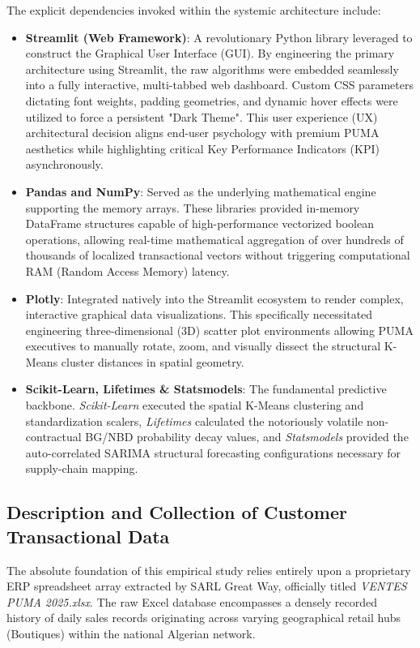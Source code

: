 \documentclass[12pt,a4paper]{report}
\begin{document}
The explicit dependencies invoked within the systemic architecture include:
\begin{itemize}
    \item \textbf{Streamlit (Web Framework)}: A revolutionary Python library leveraged to construct the Graphical User Interface (GUI). By engineering the primary architecture using Streamlit, the raw algorithms were embedded seamlessly into a fully interactive, multi-tabbed web dashboard. Custom CSS parameters dictating font weights, padding geometries, and dynamic hover effects were utilized to force a persistent "Dark Theme". This user experience (UX) architectural decision aligns end-user psychology with premium PUMA aesthetics while highlighting critical Key Performance Indicators (KPI) asynchronously.
    \item \textbf{Pandas and NumPy}: Served as the underlying mathematical engine supporting the memory arrays. These libraries provided in-memory DataFrame structures capable of high-performance vectorized boolean operations, allowing real-time mathematical aggregation of over hundreds of thousands of localized transactional vectors without triggering computational RAM (Random Access Memory) latency.
    \item \textbf{Plotly}: Integrated natively into the Streamlit ecosystem to render complex, interactive graphical data visualizations. This specifically necessitated engineering three-dimensional (3D) scatter plot environments allowing PUMA executives to manually rotate, zoom, and visually dissect the structural K-Means cluster distances in spatial geometry.
    \item \textbf{Scikit-Learn, Lifetimes \& Statsmodels}: The fundamental predictive backbone. \textit{Scikit-Learn} executed the spatial K-Means clustering and standardization scalers, \textit{Lifetimes} calculated the notoriously volatile non-contractual BG/NBD probability decay values, and \textit{Statsmodels} provided the auto-correlated SARIMA structural forecasting configurations necessary for supply-chain mapping.
\end{itemize}

\subsection{Description and Collection of Customer Transactional Data}
The absolute foundation of this empirical study relies entirely upon a proprietary ERP spreadsheet array extracted by SARL Great Way, officially titled \textit{VENTES PUMA 2025.xlsx}. The raw Excel database encompasses a densely recorded history of daily sales records originating across varying geographical retail hubs (Boutiques) within the national Algerian network. 
\end{document}
